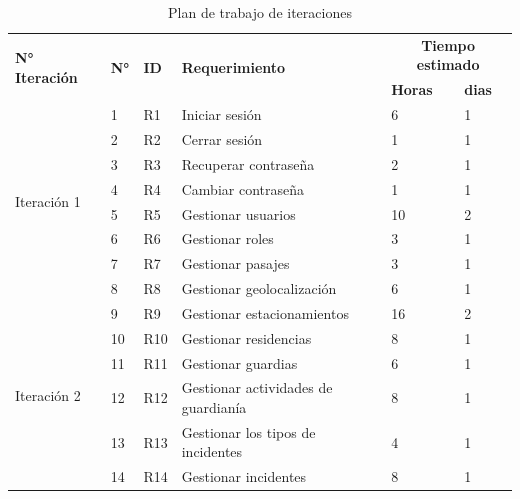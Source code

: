 \begin{footnotesize}
\begin{spacing}{1}
    \begin{center}
        \renewcommand*{\arraystretch}{1.4}
        \begin{longtable}[l]{|p{}|p{}|p{}|p{}| p{}|p{}| }
            \caption{Plan de trabajo de iteraciones}\label{tab:re_sistema_identif} \\
            \hline
            \multirow{2}{*}{\textbf{N° Iteración}} & \multirow{2}{*}{\textbf{N°}} & \multirow{2}{*}{\textbf{ID}} & \multirow{2}{*}{\textbf{Requerimiento}} & \multicolumn{2}{c|}{\textbf{Tiempo estimado}}\\
            \cline{5-6}
            & & & & \textbf{Horas} & \textbf{dias} \\
            \hline
            \multirow{8}{*}{Iteración 1} & 1 & R1 & Iniciar sesión & 6 & 1 \\
            \cline{2-6}
             & 2 & R2 & Cerrar sesión & 1 & 1 \\
            \cline{2-6}
             & 3 & R3 & Recuperar contraseña & 2 & 1 \\
            \cline{2-6}
             & 4 & R4 & Cambiar contraseña & 1 & 1 \\
            \cline{2-6}
             & 5 & R5 & Gestionar usuarios & 10 & 2 \\
            \cline{2-6}
             & 6 & R6 & Gestionar roles & 3 & 1 \\
            \cline{2-6}
             & 7 & R7 & Gestionar pasajes & 3 & 1 \\
            \cline{2-6}
             & 8 & R8 & Gestionar geolocalización & 6 & 1 \\
            \hline
            \multirow{9}{*}{Iteración 2} & 9 & R9 & Gestionar estacionamientos & 16 & 2 \\
            \cline{2-6}
             & 10 & R10 & Gestionar residencias & 8 & 1 \\
            \cline{2-6}
             & 11 & R11 & Gestionar guardias & 6 & 1 \\
            \cline{2-6}
             & 12 & R12 & Gestionar actividades de guardianía & 8 & 1 \\
            \cline{2-6}
             & 13 & R13 & Gestionar los tipos de incidentes & 4 & 1 \\
            \cline{2-6}
             & 14 & R14 & Gestionar incidentes & 8 & 1 \\

\end{longtable}
\end{center}
\end{spacing}
\end{footnotesize}
